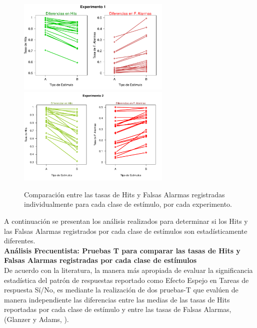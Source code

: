 \begin{figure}[th]
\centering
\includegraphics[width=0.65\textwidth]{Figures/Diff_Rate_E1}\\ 
\includegraphics[width=0.65\textwidth]{Figures/Diff_Rate_E2}\\
\caption[Resultados: Comparación entre las tasas de Hits y las tasas de Falsas Alarmas registradas por cada clase de estímulo]{Comparación entre las tasas de Hits y Falsas Alarmas registradas individualmente para cada clase de estímulo, por cada experimento.}
\label{fig:Diff_Rate}
\end{figure}

A continuación se presentan los análisis realizados para determinar si los Hits y las Falsas Alarmas registrados por cada clase de estímulos son estadísticamente diferentes.\\

\textbf{Análisis Frecuentista: Pruebas T para comparar las tasas de Hits y Falsas Alarmas registradas por cada clase de estímulos}\\

De acuerdo con la literatura, la manera más apropiada de evaluar la significancia estadística del patrón de respuestas reportado como Efecto Espejo en Tareas de respuesta Sí/No, es mediante la realización de dos pruebas-T que evalúen de manera independiente las diferencias entre las medias de las tasas de Hits reportadas por cada clase de estímulo y entre las tasas de Falsas Alarmas, (Glanzer y Adams, \citeyear{Glanzer1990}).\\

